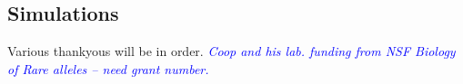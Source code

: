 \documentclass{pnastwo}
\newcommand{\jri}[1]{\textcolor{blue}{\emph{#1}} }
\begin{document}
\begin{article}
\begin{materials}
\subsection{Simulations}

\end{materials}

\begin{acknowledgments}
Various thankyous will be in order. \jri{Coop and his lab. funding from NSF Biology of Rare alleles -- need grant number.}
\end{acknowledgments}











\end{article}
\end{document}
